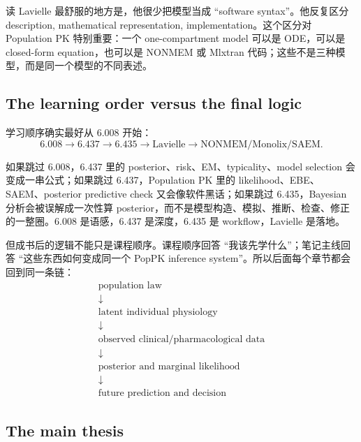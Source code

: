 \documentclass[a4paper]{article}
\begin{document}
\begin{remark}
  读 Lavielle 最舒服的地方是，他很少把模型当成 ``software syntax''。他反复区分 description, mathematical representation, implementation。这个区分对 Population PK 特别重要：一个 one-compartment model 可以是 ODE，可以是 closed-form equation，也可以是 NONMEM 或 Mlxtran 代码；这些不是三种模型，而是同一个模型的不同表述。
\end{remark}

\subsection{The learning order versus the final logic}

学习顺序确实最好从 6.008 开始：
\[
  \text{6.008}
  \longrightarrow
  \text{6.437}
  \longrightarrow
  \text{6.435}
  \longrightarrow
  \text{Lavielle}
  \longrightarrow
  \text{NONMEM/Monolix/SAEM}.
\]

\begin{warning}
  如果跳过 6.008，6.437 里的 posterior、risk、EM、typicality、model selection 会变成一串公式；如果跳过 6.437，Population PK 里的 likelihood、EBE、SAEM、posterior predictive check 又会像软件黑话；如果跳过 6.435，Bayesian 分析会被误解成一次性算 posterior，而不是模型构造、模拟、推断、检查、修正的一整圈。6.008 是语感，6.437 是深度，6.435 是 workflow，Lavielle 是落地。
\end{warning}

但成书后的逻辑不能只是课程顺序。课程顺序回答 ``我该先学什么''；笔记主线回答 ``这些东西如何变成同一个 PopPK inference system''。所以后面每个章节都会回到同一条链：
\[
  \begin{array}{c}
    \text{population law}\\
    \downarrow\\
    \text{latent individual physiology}\\
    \downarrow\\
    \text{observed clinical/pharmacological data}\\
    \downarrow\\
    \text{posterior and marginal likelihood}\\
    \downarrow\\
    \text{future prediction and decision}
  \end{array}
\]

\subsection{The main thesis}
\end{document}
